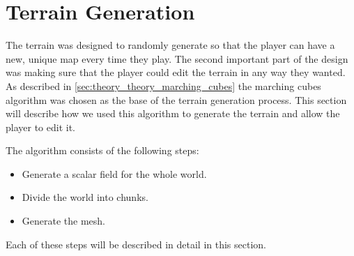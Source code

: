 \section{Terrain Generation} \label{sec:system_architecture_terrain_generation}
The terrain was designed to randomly generate so that the player can have a new, unique map every time they play.
The second important part of the design was making sure that the player could edit the terrain in any way they wanted.
As described in \autoref{sec:theory_theory_marching_cubes} the marching cubes algorithm was chosen as the base of the terrain generation process.
This section will describe how we used this algorithm to generate the terrain and allow the player to edit it.

The algorithm consists of the following steps:
\begin{itemize}
    \item Generate a scalar field for the whole world.
    \item Divide the world into chunks.
    \item Generate the mesh.
\end{itemize}

Each of these steps will be described in detail in this section.




